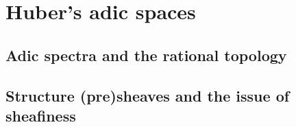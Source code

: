 \section{Huber's adic spaces}
    \subsection{Adic spectra and the rational topology}
    
    \subsection{Structure (pre)sheaves and the issue of sheafiness}
